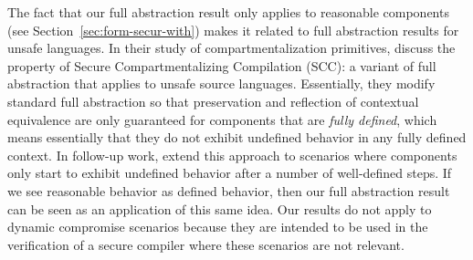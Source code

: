 \documentclass[acmsmall,screen]{acmart}\settopmatter{}
\begin{document}
The fact that our full abstraction result only applies to reasonable components (see Section~\ref{sec:form-secur-with}) makes it related to full abstraction results for unsafe languages.
In their study of compartmentalization primitives,  discuss the property of Secure Compartmentalizing Compilation (SCC): a variant of full abstraction that applies to unsafe source languages.
Essentially, they modify standard full abstraction so that preservation and reflection of contextual equivalence are only guaranteed for components that are {\itshape fully defined}, which means essentially that they do not exhibit undefined behavior in any fully defined context.
In follow-up work, \citet{Abate:2018:GCG:3243734.3243745} extend this approach to scenarios where components only start to exhibit undefined behavior after a number of well-defined steps. 
If we see reasonable behavior as defined behavior, then our full abstraction result can be seen as an application of this same idea.
Our results do not apply to dynamic compromise scenarios because they are intended to be used in the verification of a secure compiler where these scenarios are not relevant.




\end{document}
